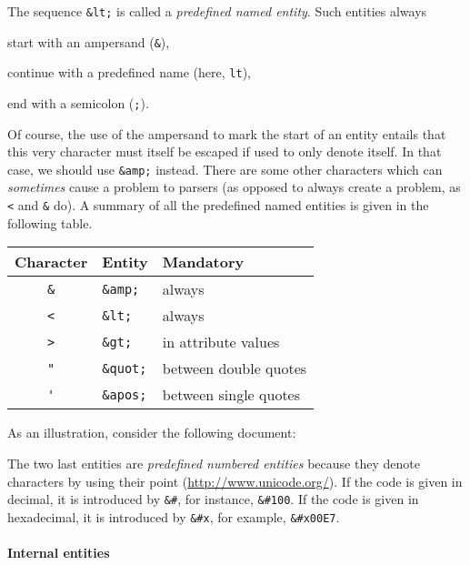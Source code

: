 The sequence \verb|&lt;| is called a \emph{predefined named entity}.
Such entities always
\begin{enumerate*}

  \item start with an ampersand (\verb|&|),

  \item continue with a predefined name (here, \texttt{lt}),

  \item end with a semicolon (\texttt{;}).

\end{enumerate*}
Of course, the use of the ampersand to mark the start of an entity
entails that this very character must itself be escaped if used to
only denote itself. In that case, we should use \verb|&amp;|
instead. There are some other characters which can \emph{sometimes}
cause a problem to \XML parsers (as opposed to always create a
problem, as \verb|<| and \verb|&| do).  A summary of all the
predefined named entities is given in the following table.
\begin{center}
\begin{tabular}{cll}
\toprule
\textsf{Character} & \textsf{Entity} & \textsf{Mandatory}\\
\midrule
\verb|&| & \verb|&amp;|  & always\\
\verb|<| & \verb|&lt;|   & always\\
\verb|>| & \verb|&gt;|   & in attribute values\\
\verb|"| & \verb|&quot;| & between double quotes\\
\verb|'| & \verb|&apos;| & between single quotes\\
\bottomrule
\end{tabular}
\end{center}

\noindent As an illustration, consider the following document:

\noindent The two last entities are \emph{predefined numbered
  entities} because they denote characters by using their \Unicode
point (\url{http://www.unicode.org/}). If the code is given in
decimal, it is introduced by \verb|&#|, for instance, \verb|&#100|. If
the code is given in hexadecimal, it is introduced by \verb|&#x|, for
example, \verb|&#x00E7|.

\paragraph{Internal entities}


